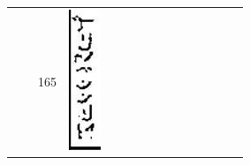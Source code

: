 \documentclass[10pt]{article}
\begin{document}
\begin{center}
\begin{tabular}{|c|c|c|c|c|c|c|c|c|c|c|c|c|c|c|}
 &  & 165 & \includegraphics[max width=\textwidth]{2025_02_27_dd68c3d38de88f0516d9g-009(12)}

\end{tabular}
\end{center}
\end{document}
